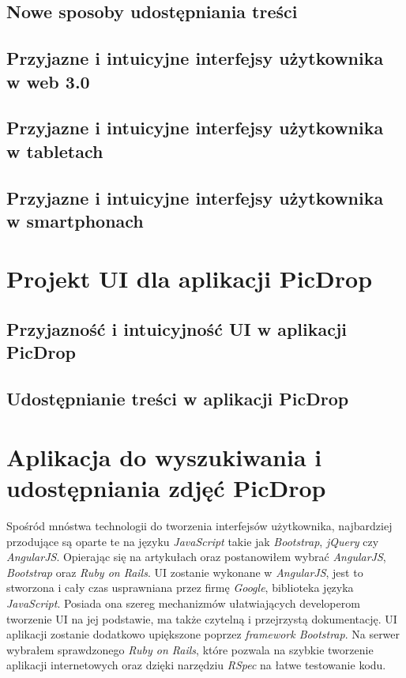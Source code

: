 \documentclass[brudnopis]{xmgr}
\begin{document}
\section{Nowe sposoby udostępniania treści}

\section{Przyjazne i intuicyjne interfejsy użytkownika\\ w web 3.0}

\section{Przyjazne i intuicyjne interfejsy użytkownika\\ w tabletach}

\section{Przyjazne i intuicyjne interfejsy użytkownika\\ w smartphonach}

\chapter{Projekt UI dla aplikacji PicDrop}

\section{Przyjazność i intuicyjność  UI w aplikacji PicDrop}

\section{Udostępnianie treści w aplikacji PicDrop}

\chapter{Aplikacja do wyszukiwania i udostępniania zdjęć PicDrop}

Spośród mnóstwa technologii do tworzenia interfejsów użytkownika, najbardziej przodujące są oparte te na języku \textit{JavaScript} takie jak \textit{Bootstrap},\textit{ jQuery} czy\\ \textit{AngularJS}. Opierając się na artykułach \cite{adamAnderson} oraz \cite{angularRailsBootstrap} postanowiłem wybrać \textit{AngularJS}, \textit{Bootstrap} oraz \textit{Ruby on Rails}. UI zostanie wykonane w \textit{AngularJS}, jest to stworzona i cały czas usprawniana przez firmę \textit{Google}, biblioteka języka \textit{JavaScript}. Posiada ona szereg mechanizmów ułatwiających developerom tworzenie UI na jej podstawie, ma także czytelną i przejrzystą dokumentację. UI aplikacji zostanie dodatkowo upiększone poprzez \textit{framework Bootstrap}. Na serwer  wybrałem sprawdzonego \textit{Ruby on Rails}, które pozwala na szybkie tworzenie aplikacji internetowych oraz dzięki narzędziu \textit{RSpec} na łatwe testowanie kodu. 
\end{document}
